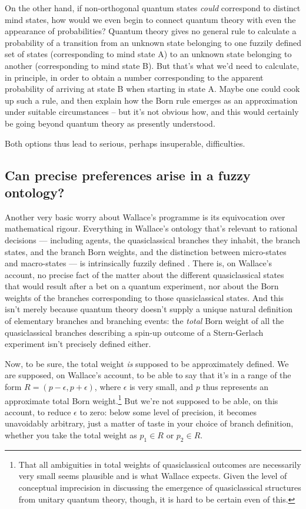 \documentclass[aps,
pra,epsfig,12pt]{revtex4}
\begin{document}
On the other hand, if non-orthogonal quantum states {\it could} correspond to 
distinct mind states, how would we even begin to 
connect quantum theory with even the appearance of probabilities?   
Quantum theory gives no general rule to calculate a 
probability of a transition from an 
unknown state belonging to one fuzzily defined set of states 
(corresponding to mind state A) to an unknown state belonging to another
(corresponding to mind state B).   But that's what we'd need to calculate,
in principle, in order to obtain a number corresponding to the apparent 
probability of arriving at state B when starting in state A.   
Maybe one could cook up such a rule, and then explain how the Born
rule emerges as an approximation under suitable circumstances -- but
it's not obvious how, and this would certainly be going beyond 
quantum theory as presently understood.  

Both options thus lead to serious, perhaps  
insuperable, difficulties. 

\subsection{Can precise preferences arise in a fuzzy ontology?}

Another very basic worry about Wallace's programme is its 
equivocation over mathematical rigour. 
Everything in Wallace's ontology that's 
relevant to rational decisions --- including agents, 
the quasiclassical branches they inhabit, the branch states, 
and the branch Born weights, and the distinction between micro-states
and macro-states --- is intrinsically fuzzily defined \cite{wallacevolone}.   
There is,
on Wallace's account, no precise fact of the matter about the 
different quasiclassical states that would result after a bet
on a quantum experiment, nor about the Born weights of the branches
corresponding to those quasiclassical states.   And this isn't merely
because quantum theory doesn't supply a unique natural definition of 
elementary branches and branching events: the {\it total} Born 
weight of all the quasiclassical branches describing a spin-up
outcome of a Stern-Gerlach experiment isn't precisely defined either. 

Now, to be sure, the total weight {\it is} supposed to 
be approximately defined.  We are supposed, on Wallace's
account, to be able to say that it's in a range of the 
form $ R = ( p - \epsilon, p + \epsilon )$, where $\epsilon$ is 
very small, and $p$ thus 
represents an approximate total Born weight.\footnote{That
all ambiguities in total weights of quasiclassical outcomes 
are necessarily very small seems plausible and is what Wallace expects.  
Given the level of conceptual imprecision in discussing the emergence
of quasiclassical structures from unitary quantum theory, 
though, it is hard to be certain even of this.}
But we're not supposed to be able, on
this account, to reduce $\epsilon$ to zero: below some level 
of precision, it becomes unavoidably arbitrary, just a matter of taste 
in your choice of branch definition, whether you take  
the total weight as $p_1 \in R$ or $p_2 \in R$. 
\end{document}
